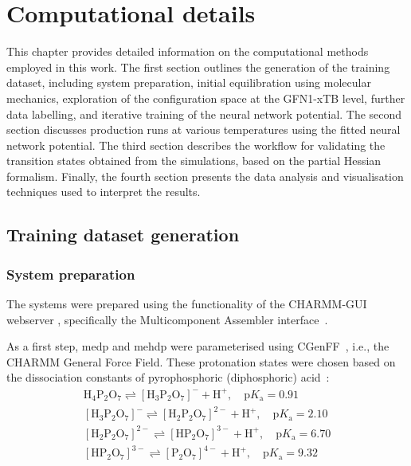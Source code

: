 \chapter{Computational details}
This chapter provides detailed information on the computational methods employed in this work. The first section outlines the generation of the training dataset, including system preparation, initial equilibration using molecular mechanics, exploration of the configuration space at the GFN1-xTB level, further data labelling, and iterative training of the neural network potential. The second section discusses production runs at various temperatures using the fitted neural network potential. The third section describes the workflow for validating the transition states obtained from the simulations, based on the partial Hessian formalism. Finally, the fourth section presents the data analysis and visualisation techniques used to interpret the results.




\section{Training dataset generation}

\subsection{System preparation}
The systems were prepared using the functionality of the CHARMM-GUI webserver \citep{joCHARMMGUIWebbasedGraphical2008}, specifically the Multicomponent Assembler interface~\citep{kernCHARMMGUIMulticomponentAssembler2024}.

As a first step, \acf{medp} and \acf{mehdp} were parameterised using CGenFF~\citep{kimCHARMMGUILigandReader2017}, i.e., the CHARMM General Force Field. These protonation states were chosen based on the dissociation constants of pyrophosphoric (diphosphoric) acid~\citep{haynesCRCHandbookChemistry2016}:
\begin{align*}
    \mathrm{H_4P_2O_7} \rightleftharpoons \mathrm{[H_3P_2O_7]^-} + \mathrm{H^+},\quad \mathrm{p}K_\mathrm{a} = 0.91 \\
    \mathrm{[H_3P_2O_7]^-} \rightleftharpoons \mathrm{[H_2P_2O_7]^{2-}} + \mathrm{H^+},\quad \mathrm{p}K_\mathrm{a} = 2.10 \\
    \mathrm{[H_2P_2O_7]^{2-}} \rightleftharpoons \mathrm{[HP_2O_7]^{3-}} + \mathrm{H^+},\quad \mathrm{p}K_\mathrm{a} = 6.70 \\
    \mathrm{[HP_2O_7]^{3-}} \rightleftharpoons \mathrm{[P_2O_7]^{4-}} + \mathrm{H^+},\quad \mathrm{p}K_\mathrm{a} = 9.32
\end{align*}

